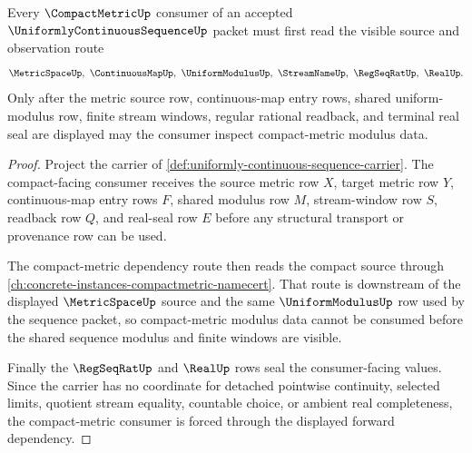 \begin{theorem}
\label{thm:uniformly-continuous-sequence-compact-metric-forward-dependency}
Every $\CompactMetricUp$ consumer of an accepted $\UniformlyContinuousSequenceUp$ packet must first read the visible source and observation route
$$
\MetricSpaceUp,\ \ContinuousMapUp,\ \UniformModulusUp,\ \StreamNameUp,\ \RegSeqRatUp,\ \RealUp .
$$
Only after the metric source row, continuous-map entry rows, shared uniform-modulus row, finite stream windows, regular rational readback, and terminal real seal are displayed may the consumer inspect compact-metric modulus data.
\end{theorem}
\begin{proof}
Project the carrier of \autoref{def:uniformly-continuous-sequence-carrier}. The compact-facing consumer receives the source metric row $X$, target metric row $Y$, continuous-map entry rows $F$, shared modulus row $M$, stream-window row $S$, readback row $Q$, and real-seal row $E$ before any structural transport or provenance row can be used.

The compact-metric dependency route then reads the compact source through \autoref{ch:concrete-instances-compactmetric-namecert}. That route is downstream of the displayed $\MetricSpaceUp$ source and the same $\UniformModulusUp$ row used by the sequence packet, so compact-metric modulus data cannot be consumed before the shared sequence modulus and finite windows are visible.

Finally the $\RegSeqRatUp$ and $\RealUp$ rows seal the consumer-facing values. Since the carrier has no coordinate for detached pointwise continuity, selected limits, quotient stream equality, countable choice, or ambient real completeness, the compact-metric consumer is forced through the displayed forward dependency.
\end{proof}
